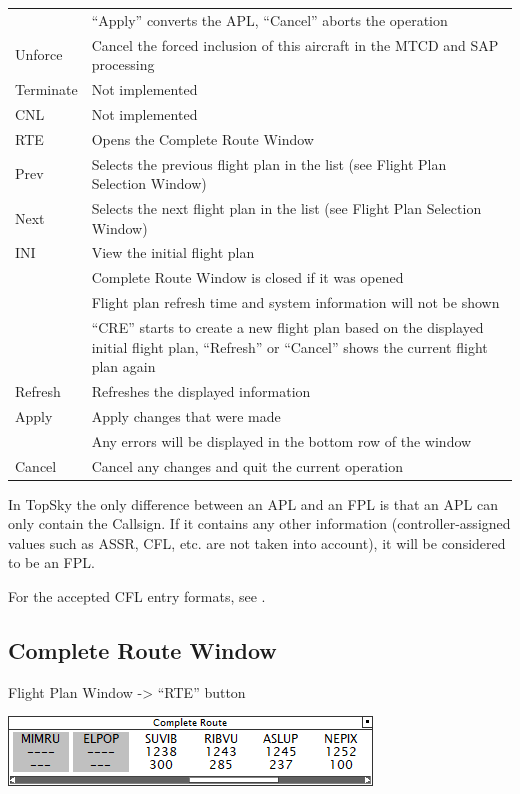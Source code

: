 \documentclass[11pt,a4paper]{memoir}
\begin{document}
\begin{tabular}{l l}
                & “Apply” converts the APL, “Cancel” aborts the operation\\
    Unforce     & Cancel the forced inclusion of this aircraft in the MTCD and SAP processing\\
    Terminate   & Not implemented\\
    CNL         & Not implemented\\
    RTE         & Opens the Complete Route Window\\
    Prev        & Selects the previous flight plan in the list (see Flight Plan Selection Window)\\
    Next        & Selects the next flight plan in the list (see Flight Plan Selection Window)\\
    INI         & View the initial flight plan\\
                & Complete Route Window is closed if it was opened\\
                & Flight plan refresh time and system information will not be shown\\
                & “CRE” starts to create a new flight plan based on the displayed initial flight plan, “Refresh” or “Cancel” shows the current flight plan again\\
    Refresh     & Refreshes the displayed information\\
    Apply       & Apply changes that were made\\
                & Any errors will be displayed in the bottom row of the window\\
    Cancel      & Cancel any changes and quit the current operation\\
\end{tabular}

In TopSky the only difference between an APL and an FPL is that an APL can only contain the Callsign. If it contains any other information (controller-assigned values such as ASSR, CFL, etc. are not taken into account), it will be considered to be an FPL.

For the accepted CFL entry formats, see \textit{}.

\subsection{Complete Route Window}
\label{win:crw}

Flight Plan Window -> “RTE” button

\includegraphics{img/route.png}
\end{document}
